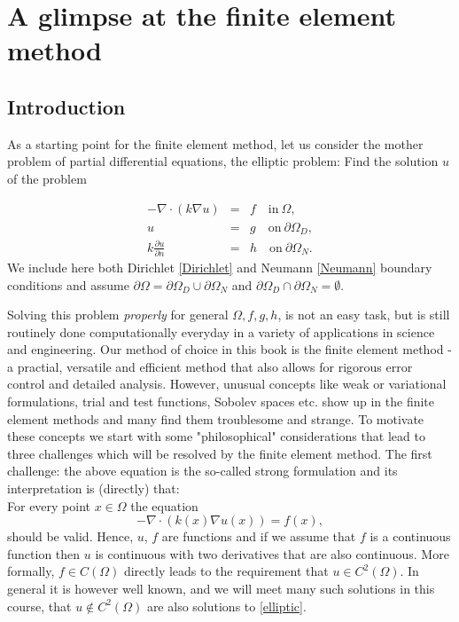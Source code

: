 \chapter{A glimpse at the finite element method}




\label{elliptic}
\section{Introduction}

As a starting point for the finite element method, let us
consider the mother problem of partial differential equations, 
the elliptic problem: Find the solution $u$ of the problem

\begin{eqnarray}
\label{elliptic}
-\nabla\cdot(k\nabla u)  &=& f \quad \textrm{in}\ \Omega,\\
\label{Dirichlet}
u&=& g \quad \textrm{on}\ \partial\Omega_D, \\
\label{Neumann}
k \frac{\partial u}{\partial n}&=& h \quad \textrm{on}\ \partial\Omega_N . 
\end{eqnarray}
We include here both Dirichlet \eqref{Dirichlet} and Neumann \eqref{Neumann} boundary conditions
and assume $\partial \Omega = \partial \Omega_D \cup \partial \Omega_N$ 
and $\partial \Omega_D \cap \partial \Omega_N = \emptyset$.
 

Solving this problem \emph{properly} for general $\Omega, f, g, h$, is not an easy task, but is still 
routinely done computationally everyday in a variety of applications in science and engineering. 
Our method of choice in this book is the finite element method - a practial, versatile and efficient method
that also allows for rigorous error control and detailed analysis.  
However, unusual concepts like weak or variational formulations, trial and test functions, Sobolev
spaces etc. show up in the finite element methods and many find them troublesome and strange. To motivate
these concepts we start with some "philosophical" considerations that lead to three challenges which 
will be resolved by the finite element method. The first challenge: the above equation is 
the so-called strong formulation and its interpretation is (directly) that: \\ 
For every point $x \in \Omega$ the equation 
\begin{equation}
\label{strong:elliptic}
-\nabla\cdot(k(x) \nabla u(x))  = f(x),  
\end{equation}
should be valid. Hence, $u$, $f$ are functions and
if we assume that $f$ is a continuous function then $u$ is continuous with two derivatives that are also continuous.   
More formally, $f\in C(\Omega)$ directly leads to the requirement that $u\in C^2(\Omega)$. In general 
it is however well known, and we will meet many such solutions in this course, that $u \not \in C^2(\Omega)$ are also
solutions to \eqref{elliptic}. 



